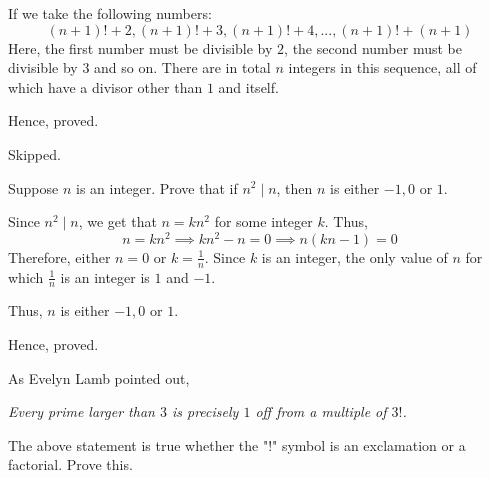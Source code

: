 \begin{solution}
	If we take the following numbers:
	$$(n+1)! + 2, (n+1)! + 3, (n+1)! + 4, ..., (n+1)! + (n+1)$$
	Here, the first number must be divisible by $2$, the second number must be divisible by $3$ and so on.
	There are in total $n$ integers in this sequence, all of which have a divisor other than $1$ and itself.

	Hence, proved.
\end{solution}

\begin{problem}Skipped.\end{problem}

\begin{problem}
	Suppose $n$ is an integer. Prove that if $n^2 \mid n$, then $n$ is either $-1, 0$ or $1$.
\end{problem}

\begin{solution}
	Since $n^2 \mid n$, we get that $n = kn^2$ for some integer $k$. Thus, 
	$$n = kn^2 \implies kn^2 - n = 0 \implies n(kn-1) = 0$$
	Therefore, either $n = 0$ or $k = \frac{1}{n}$. Since $k$ is an integer, the only value of $n$ for which $\frac{1}{n}$ is an integer is $1$ and $-1$.

	Thus, $n$ is either $-1, 0$ or $1$.

	Hence, proved.
\end{solution}

\begin{problem}
	As Evelyn Lamb pointed out,

	\bigbreak
	\emph{Every prime larger than $3$ is precisely $1$ off from a multiple of $3!$.}
	\bigbreak

	The above statement is true whether the "!" symbol is an exclamation or a factorial. Prove this.
\end{problem}

